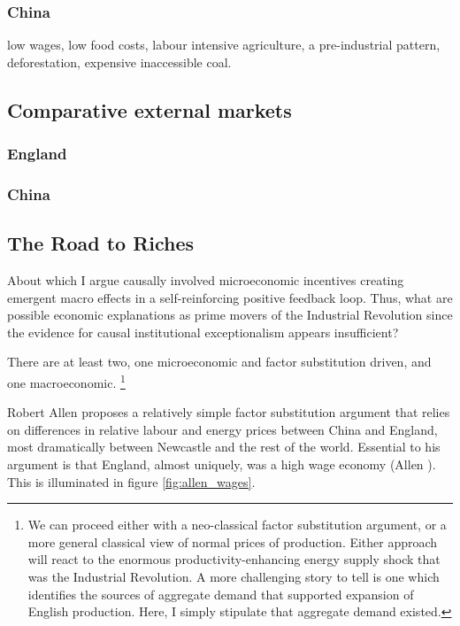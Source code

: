 \documentclass[12pt]{article}
\numberwithin{equation}{section}
\begin{document}
			\subsubsection{China}
			low wages, low food costs, labour intensive agriculture, a pre-industrial pattern, deforestation, expensive inaccessible coal.
		\subsection{Comparative external markets}
			\subsubsection{England}
			\subsubsection{China}

			
		\subsection*{The Road to Riches}
		
		About which I argue causally involved microeconomic incentives creating emergent macro effects in a self-reinforcing positive feedback loop. Thus, what are possible economic explanations as prime movers of the Industrial Revolution since the evidence for causal institutional exceptionalism appears insufficient?
		
		There are at least two, one microeconomic and factor substitution driven, and one macroeconomic. \footnote{We can proceed either with a neo-classical factor substitution argument, or a more general classical view of normal prices of production. Either approach will react to the enormous productivity-enhancing energy supply shock that was the Industrial Revolution. A more challenging story to tell is one which identifies the sources of aggregate demand that supported expansion of English production. Here, I simply stipulate that aggregate demand existed.}
		
		Robert Allen proposes a relatively simple factor substitution argument that relies on differences in relative labour and energy prices between China and England, most dramatically between Newcastle and the rest of the world. Essential to his argument is that England, almost uniquely, was a high wage economy (Allen \citeyear[p.~34]{allen_british_2009}). This is illuminated in figure \ref{fig:allen_wages}. 
		
\end{document}
